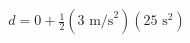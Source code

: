 \documentclass[preview]{standalone}
\begin{document}
\begin{align*}
d = 0 + \frac{1}{2}(3 \text{ m/s}^2)(25 \text{ s}^2)
\end{align*}
\end{document}
